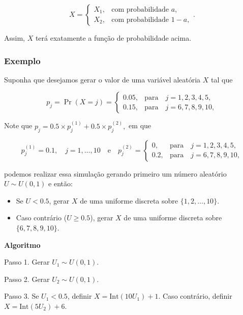 \documentclass[
  letterpaper,
  DIV=11,
  numbers=noendperiod]{scrreprt}
\providecommand{\tightlist}{%
  \setlength{\itemsep}{0pt}\setlength{\parskip}{0pt}}\usepackage{longtable,booktabs,array}
\begin{document}
\[X =
\begin{cases}
X_1, & \text{com probabilidade } a, \\
X_2, & \text{com probabilidade } 1-a ,
\end{cases}.\]

Assim, \(X\) terá exatamente a função de probabilidade acima.

\subsubsection*{Exemplo}\label{exemplo-5}

Suponha que desejamos gerar o valor de uma variável aleatória \(X\) tal
que

\[p_j = \Pr(X = j) =  \begin{cases}
0.05, & \text{para}\quad j = 1, 2, 3, 4, 5, \\
0.15, & \text{para}\quad  j = 6, 7, 8, 9, 10,
\end{cases}\]

Note que \(p_j = 0.5 \times p_j^{(1)} + 0.5 \times p_j^{(2)},\) em que

\[p_j^{(1)} = 0.1, \quad j = 1, \dots, 10 \quad \text{e} \quad p_j^{(2)} = \begin{cases}
0, & \text{para}\quad j = 1, 2, 3, 4, 5, \\
0.2, & \text{para}\quad  j = 6, 7, 8, 9, 10,
\end{cases}\]

podemos realizar essa simulação gerando primeiro um número aleatório
\(U \sim U(0,1)\) e então:

\begin{itemize}
\tightlist
\item
  Se \(U < 0.5\), gerar \(X\) de uma uniforme discreta sobre
  \(\{1,2,\dots,10\}\).
\item
  Caso contrário (\(U \geq 0.5\)), gerar \(X\) de uma uniforme discreta
  sobre \(\{6,7,8,9,10\}\).
\end{itemize}

\begin{tcolorbox}[enhanced jigsaw, toprule=.15mm, arc=.35mm, colframe=quarto-callout-warning-color-frame, breakable, opacityback=0, rightrule=.15mm, bottomrule=.15mm, left=2mm, leftrule=.75mm, colback=white]

\vspace{-3mm}\textbf{Algoritmo}\vspace{3mm}

Passo 1. Gerar \(U_1 \sim U(0,1)\).

Passo 2. Gerar \(U_2 \sim U(0,1)\).

Passo 3. Se \(U_1 < 0.5\), definir \(X = \mathrm{Int}(10U_1)+1\). Caso
contrário, definir \(X = \mathrm{Int}(5U_2)+6\).

\end{tcolorbox}
\end{document}

